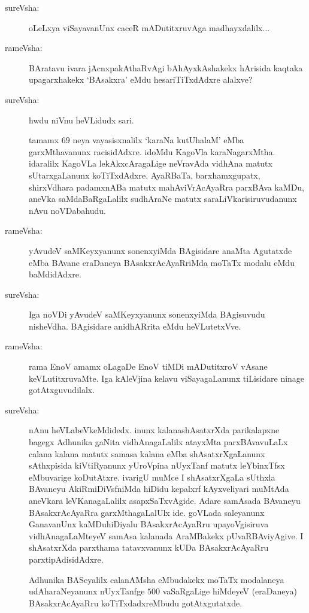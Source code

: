 \begin{description}
\item[sureVsha:] oLeLxya viSayavanUnx caceR mADutitxruvAga madhayxdalilx...

\item[rameVsha:] BAratavu ivara jAcnxpakAthaRvAgi bAhAyxkAshakekx hArisida kaqtaka upagarxhakekx `BAsakxra' eMdu hesariTiTxdAdxre alalxve?

\item[sureVsha:] hwdu niVnu heVLidudx sari.

tamamx $69$ neya vayasisxnalilx `karaNa kutUhalaM' eMba garxMthavanunx racisidAdxre. idoMdu KagoVla karaNagarxMtha. idaralilx KagoVLa lekAkxcAragaLige neVravAda vidhAna matutx sUtarxgaLanunx koTiTxdAdxre. AyaRBaTa, barxhamxgupatx, shirxVdhara padamxnABa matutx mahAviVrAcAyaRra parxBAva kaMDu, aneVka saMdaBaRgaLalilx sudhAraNe matutx saraLiVkarisiruvudanunx nAvu noVDabahudu.

\item[rameVsha:] yAvudeV saMKeyxyanunx sonenxyiMda BAgisidare anaMta Agutatxde eMba BAvane eraDaneya BAsakxrAcAyaRriMda moTaTx modalu eMdu baMdidAdxre.

\item[sureVsha:] Iga noVDi yAvudeV saMKeyxyanunx sonenxyiMda BAgisuvudu nisheVdha. BAgisidare anidhARrita eMdu heVLutetxVve.

\item[rameVsha:] rama EnoV amamx oLagaDe EnoV tiMDi mADutitxroV vAsane keVLutitxruvaMte. Iga kAleVjina kelavu viSayagaLanunx tiLisidare ninage gotAtxguvudilalx.

\item[sureVsha:] nAnu heVLabeVkeMdidedx. inunx kalanashAsatxrXda parikalapxne bagegx Adhunika gaNita vidhAnagaLalilx atayxMta parxBAvavuLaLx calana kalana matutx samasa kalana eMba shAsatxrXgaLanunx sAthxpisida kiVtiRyanunx yUroVpina nUyxTanf matutx leYbinxTfsx eMbuvarige koDutAtxre. ivarigU muMce I shAsatxrXgaLa sUthxla BAvaneyu AkiRmiDiVsfniMda hiDidu kepalxrf kAyxveliyari muMtAda aneVkara leVKanagaLalilx asapxSaTxvAgide. Adare samAsada BAvaneyu BAsakxrAcAyaRra garxMthagaLalUlx ide. goVLada saleyanunx GanavanUnx kaMDuhiDiyalu BAsakxrAcAyaRru upayoVgisiruva vidhAnagaLaMteyeV samAsa kalanada AraMBakekx pUvaRBAviyAgive. I shAsatxrXda parxthama tatavxvanunx kUDa BAsakxrAcAyaRru parxtipAdisidAdxre.

Adhunika BASeyalilx calanAMsha eMbudakekx moTaTx modalaneya udAharaNeyanunx nUyxTanfge $500$ vaSaRgaLige hiMdeyeV (eraDaneya) BAsakxrAcAyaRru koTiTxdadxreMbudu gotAtxgutatxde.


\end{description}
